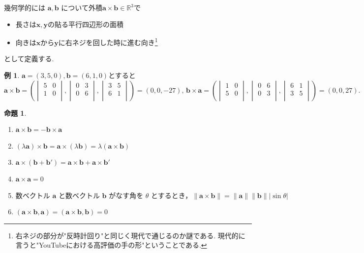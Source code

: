\documentclass[dvipdfmx,a4paper,11pt]{article} %
\newcommand{\R}{\mathbb{R}}
\theoremstyle{definition}
\newtheorem{prop}[thm]{命題}
\newtheorem{exa}[thm]{例}
\begin{document}
 幾何学的には
$\bm{a}, \bm{b}$
について外積$\bm{a} \times \bm{b}  \in \R^3$で
 \begin{itemize}
 	\setlength{\parskip}{0cm}
  	\setlength{\itemsep}{0pt}
\item 長さは$\bm{x}, \bm{y}$の貼る平行四辺形の面積
\item 向きは$\bm{x}$から$\bm{y}$に右ネジを回した時に進む向き\footnote{右ネジの部分が"反時計回り"と同じく現代で通じるのか謎である. 現代的に言うと"YouTubeにおける高評価の手の形"ということである. }
 \end{itemize}
 として定義する. 
 
 \begin{exa}
 $\bm{a}=(3, 5, 0), \bm{b}=(6, 1, 0)$とすると
 $$
 \bm{a} \times \bm{b}
 =\left(\begin{vmatrix}
5&0\\
1&0 \\
\end{vmatrix},
\begin{vmatrix}
0&3\\
0&6 \\
\end{vmatrix},
\begin{vmatrix}
3&5\\
6&1 \\
\end{vmatrix}
\right)
= (0,0,-27)
\text{, } 
\bm{b} \times  \bm{a} 
 =\left(\begin{vmatrix}
1&0 \\
5&0\\
\end{vmatrix},
\begin{vmatrix}
0&6 \\
0&3\\
\end{vmatrix},
\begin{vmatrix}
6&1 \\
3&5\\
\end{vmatrix}
\right)
= (0,0,27).
 $$
 \end{exa}
 
 \begin{prop}\cite[問題 1.1.2]{O}
\begin{enumerate}[label={(\arabic*)}]
\item \(\bm{a}\times \bm{b}=-\bm{b}\times \bm{a}\)
\item \((\lambda \bm{a})\times \bm{b}=\bm{a}\times (\lambda \bm{b})=\lambda(\bm{a}\times \bm{b})\)
\item \(\bm{a}\times (\bm{b}+\bm{b}')=\bm{a}\times \bm{b}+\bm{a}\times \bm{b}'\)
\item \(\bm{a}\times \bm{a}=0\)
\item \(\text{数ベクトル }\bm{a}\text{ と数ベクトル }\bm{b}\text{ がなす角を }\theta\text{ とするとき，} \|\bm{a}\times \bm{b}\|=\|\bm{a}\|\|\bm{b}\||\sin\theta|\)
\item \((\bm{a}\times \bm{b},\bm{a})=(\bm{a}\times \bm{b},\bm{b})=0\)
\end{enumerate}
 \end{prop}
\end{document}
